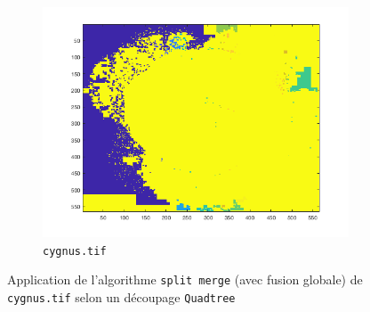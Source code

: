\documentclass[a4paper]{article}
\begin{document}
\begin{figure}[H]
    \centering
     
    \begin{subfigure}[c]{0.6\textwidth}
        \centering
        \includegraphics[width=\textwidth]{images/ex2q3_cygnus.png}
        \caption{\texttt{cygnus.tif}}
    \label{subfig:ex2q3_cygnus}
    \end{subfigure}

    
    \caption{Application de l'algorithme \texttt{split merge} (avec fusion
    globale) de \texttt{cygnus.tif} selon un découpage \texttt{Quadtree}}
    \label{fig:ex2q3}
\end{figure}
\end{document}

